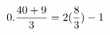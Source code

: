 \documentclass[preview]{standalone}
\begin{document}
\begin{align*}
\special{dvisvgm:raw <g id='unique000'>}0.\frac{40 + 9}{3} = 2(\frac{8}{3}) - 1\special{dvisvgm:raw </g>}
\end{align*}
\end{document}
